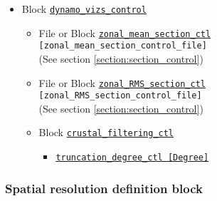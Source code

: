 \begin{itemize}
\begin{itemize}
\begin{itemize}
                            {\tt [section\_control\_file]} \\
								(See section \ref{section:section_control})
		\end{itemize}
%
    \item \hyperref[href_t:i_step_isosurface_ctl]
		{\tt i\_step\_isosurface\_ctl  [ISTEP\_ISOSURFACE]}
    \item Array \hyperref[href_t:isosurface_ctl]{\tt isosurface\_ctl}
		\begin{itemize}
		\item File or Block {\tt isosurface\_ctl} \\
                            {\tt [isosurface\_control\_file]} \\
								(See section \ref{section:isosurface_control})
		\end{itemize}
    \end{itemize}
%
\item Block \hyperref[href_t:dynamo_vizs_control]{\tt dynamo\_vizs\_control}
	\begin{itemize} \label{href_i:dynamo_vizs_control}
		\item File or Block \hyperref[href_t:zonal_mean_section_ctl]
							{\tt zonal\_mean\_section\_ctl} \\
							{\tt [zonal\_mean\_section\_control\_file]} \\
								(See section \ref{section:section_control})
		\item File or Block \hyperref[href_t:zonal_RMS_section_ctl]
							{\tt zonal\_RMS\_section\_ctl} \\
                            {\tt [zonal\_RMS\_section\_control\_file]} \\
                                (See section \ref{section:section_control})
%
		\item Block \hyperref[href_t:crustal_filtering_ctl]{\tt crustal\_filtering\_ctl}
			\begin{itemize}
				\item \hyperref[href_t:crustal_filtering_ctl]
						{\tt truncation\_degree\_ctl          [Degree]}
			\end{itemize}
	\end{itemize}
\end{itemize}
%
%
%
\subsubsection{Spatial resolution definition block}
\label{section:resolution_block}

